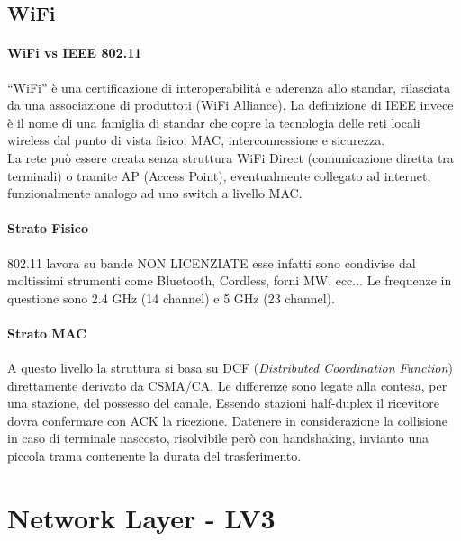 \documentclass[12pt]{article}
\begin{document}
\subsection{WiFi}
\paragraph{WiFi vs IEEE 802.11}
``WiFi'' è una certificazione di interoperabilità e aderenza allo standar, rilasciata da una associazione di produttoti (WiFi Alliance). La definizione di IEEE invece è il nome di una famiglia di standar che copre la tecnologia delle reti locali wireless dal punto di vista fisico, MAC, interconnessione e sicurezza.\\
La rete può essere creata senza struttura WiFi Direct (comunicazione diretta tra terminali) o tramite AP (Access Point), eventualmente collegato ad internet, funzionalmente analogo ad uno switch a livello MAC.
\paragraph{Strato Fisico}
802.11 lavora su bande NON LICENZIATE esse infatti sono condivise dal moltissimi strumenti come Bluetooth, Cordless, forni MW, ecc... Le frequenze in questione sono 2.4 GHz (14 channel) e 5 GHz (23 channel).
\paragraph{Strato MAC}
A questo livello la struttura si basa su DCF (\textit{Distributed Coordination Function}) direttamente derivato da CSMA/CA. Le differenze sono legate alla contesa, per una stazione, del possesso del canale. Essendo stazioni half-duplex il ricevitore dovra confermare con ACK la ricezione. Datenere in considerazione la collisione in caso di terminale nascosto, risolvibile però con handshaking, invianto una piccola trama contenente la durata del trasferimento.


\section{Network Layer - LV3} \label{LV3}
\end{document}
